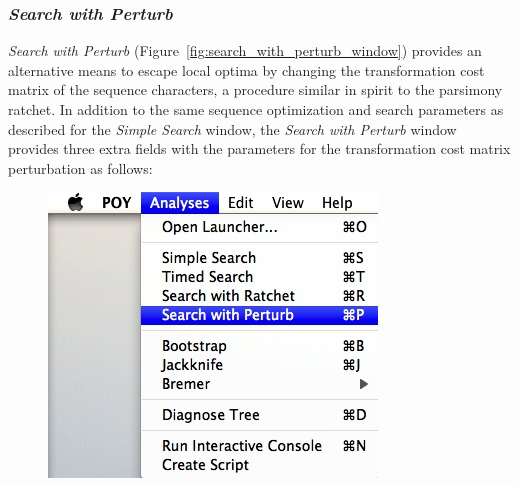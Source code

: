 {\subsubsection*{\emph{Search with Perturb}}

\emph{Search with Perturb} (Figure~\ref{fig:search_with_perturb_window}) provides an alternative means to escape local 
optima by changing the transformation cost matrix of the sequence characters, a procedure similar in spirit to the parsimony 
ratchet. In addition to the same sequence optimization and search parameters as described for the \emph{Simple Search} 
window, the \emph{Search with Perturb} window provides three extra fields with the parameters for the
transformation cost matrix perturbation as follows:

\begin{figure}
\centering
\begin{minipage}[c]{0.45\textwidth}
\includegraphics[width=\textwidth]{doc/figures/searchwithperturb_menu.jpg}
\end{minipage}
\,
\begin{minipage}[c]{0.52\textwidth}

\end{minipage}
\end{figure}}
